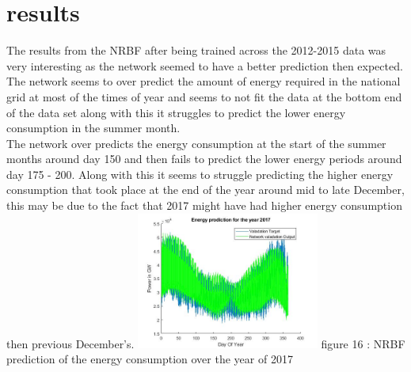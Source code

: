 \documentclass{IEEEtran}[11pt]
\begin{document}
\section{results}
\begin{flushleft}
  The results from the NRBF after being trained across the 2012-2015 data was
  very interesting as the network seemed to have a better prediction then expected.
  The network seems to over predict the amount of energy required in the national
  grid at most of the times of year and seems to not fit the data at the bottom
  end of the data set along with this it struggles to predict the  lower energy
  consumption in the summer month.
  \\
  \vspace{1.5mm}
  The network over predicts the energy consumption
  at the start of the summer months around day 150 and then fails to predict the
  lower energy periods around day 175 - 200. Along with this it seems to struggle
  predicting the higher energy consumption that took place at the end of the year
  around mid to late December, this may be due to the fact that 2017 might have
  had higher energy consumption then previous December's.
  \vspace{1.5mm}
  \includegraphics[width = 0.45\textwidth]{2017prediction.jpg}
  \vspace{1.5mm}
  {\footnotesize figure 16 : NRBF prediction of the energy consumption over the
  year of 2017 }
  \\
  \vspace{1.5mm}


\end{flushleft}
\end{document}
